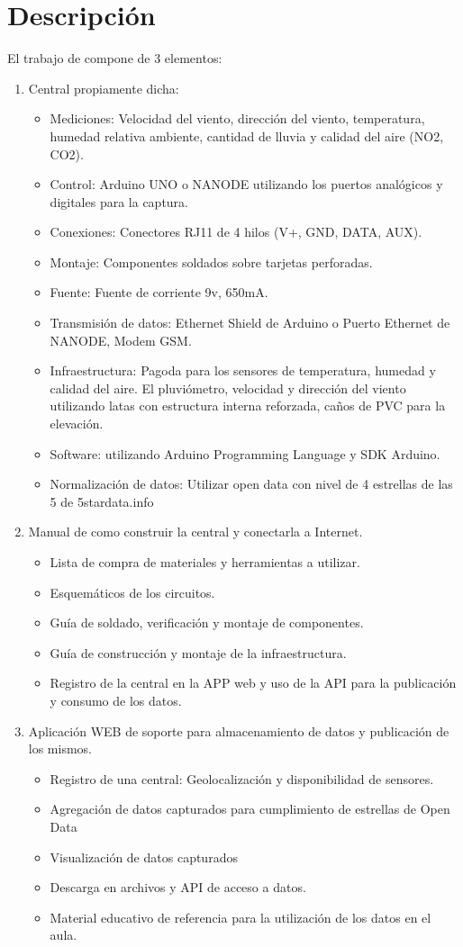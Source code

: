 \documentclass[11pt, spanish]{report}
\begin{document}
\section{Descripción}
El trabajo de compone de 3 elementos:
\begin{enumerate}
\item Central propiamente dicha:
\begin{itemize}
\item Mediciones: Velocidad del viento, dirección del viento, temperatura, humedad relativa ambiente, cantidad de lluvia y calidad del aire (NO2, CO2).
\item Control: Arduino UNO o NANODE utilizando los puertos analógicos y digitales para la captura.
\item Conexiones: Conectores RJ11 de 4 hilos (V+, GND, DATA, AUX).
\item Montaje: Componentes soldados sobre tarjetas perforadas.
\item Fuente: Fuente de corriente 9v, 650mA.
\item Transmisión de datos: Ethernet Shield de Arduino o Puerto Ethernet de NANODE, Modem GSM.
\item Infraestructura: Pagoda para los sensores de temperatura, humedad y calidad del aire. El pluviómetro, velocidad y dirección del viento utilizando latas con estructura interna reforzada, caños de PVC para la elevación.
\item Software: utilizando Arduino Programming Language y SDK Arduino.
\item Normalización de datos: Utilizar open data con nivel de 4 estrellas de las 5 de 5stardata.info
\end{itemize}
\item Manual de como construir la central y conectarla a Internet.
\begin{itemize}
\item Lista de compra de materiales y herramientas a utilizar.
\item Esquemáticos de los circuitos.
\item Guía de soldado, verificación y montaje de componentes.
\item Guía de construcción y montaje de la infraestructura.
\item Registro de la central en la APP web y uso de la API para la publicación y consumo de los datos.
\end{itemize}
\item Aplicación WEB de soporte para almacenamiento de datos y publicación de los mismos.
\begin{itemize}
\item Registro de una central: Geolocalización y disponibilidad de sensores.
\item Agregación de datos capturados para cumplimiento de estrellas de Open Data
\item Visualización de datos capturados
\item Descarga en archivos y API de acceso a datos.
\item Material educativo de referencia para la utilización de los datos en el aula.
\end{itemize}
\end{enumerate}
\end{document}
